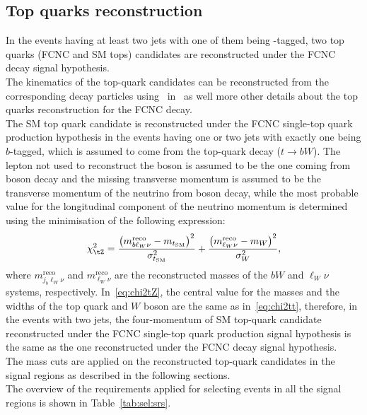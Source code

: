 \subsection {Top quarks reconstruction}
In the events having at least two jets with one of them being \Pqb-tagged, two top quarks (FCNC and SM tops) candidates are reconstructed under the FCNC \ttbar decay signal hypothesis.\\
The kinematics of the top-quark candidates can be reconstructed from
the corresponding decay particles using~ in~ as well more other details about the top quarks reconstruction for the FCNC \ttbar decay.\\
The SM top quark candidate is reconstructed under the FCNC single-top quark production hypothesis in the events having one or two jets with exactly one being $b$-tagged,
which is assumed to come from the top-quark decay ($t\to bW$). 
The lepton not used to reconstruct the \PZ boson is assumed to be the one coming from \PW boson decay
and the missing transverse momentum is assumed to be the transverse momentum of the neutrino from \PW boson decay,
while the most probable value for the longitudinal component of the neutrino momentum is determined using the minimisation of the following expression:
\begin{equation}
\chi^2_{\tZ}  = 
\frac{\left(m^{\mathrm{reco}}_{b\ell_W\nu}-m_{t_{\mathrm{SM}}}\right)^2}{\sigma_{t_{\mathrm{SM}}}^2}
+ \frac{\left(m^{\mathrm{reco}}_{\ell_W\nu}-m_W\right)^2}{\sigma_W^2},
\label{eq:chi2tZ}
\end{equation}
where $m^{\mathrm{reco}}_{j_b\ell_W\nu}$ and $m^{\mathrm{reco}}_{\ell_W\nu}$ are 
the reconstructed masses of the $bW$ and $\ell_W\nu$ systems, respectively.
In~\cref{eq:chi2tZ}, the central value for the masses and the widths
of the top quark and $W$ boson are
the same as in~\cref{eq:chi2tt}, therefore, in the events with two jets,
the four-momentum of SM top-quark candidate reconstructed under the FCNC single-top quark
production signal hypothesis is the same as the one
reconstructed under the FCNC \ttbar decay signal hypothesis.\\
The mass cuts are applied on the reconstructed top-quark candidates in the signal regions as described in the following sections.\\
The overview of the requirements applied for selecting events in all the signal regions is shown in Table~\ref{tab:sel:srs}. 


